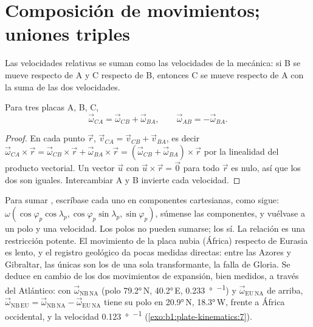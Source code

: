 \section{Composición de movimientos; uniones triples}

Las velocidades relativas se suman como las velocidades de la mecánica: si B se mueve respecto de A y C respecto de B, entonces C se
mueve respecto de A con la suma de las dos velocidades.

\begin{proposition}\label{prop:b1:plate-kinematics:addition}
Para tres placas A, B, C,
\[
  \vec\omega_{CA} = \vec\omega_{CB} + \vec\omega_{BA}, \qquad
  \vec\omega_{AB} = -\vec\omega_{BA}.
\]
\end{proposition}

\begin{proof}
En cada punto $\vec r$, $\vec v_{CA} = \vec v_{CB} + \vec v_{BA}$, es decir
$\vec\omega_{CA}\times\vec r = \vec\omega_{CB}\times\vec r +
\vec\omega_{BA}\times\vec r = (\vec\omega_{CB} + \vec\omega_{BA})\times\vec r$
por la linealidad del producto vectorial. Un vector $\vec u$ con
$\vec u\times\vec r = \vec 0$ para todo $\vec r$ es nulo, así que los dos 
son iguales. Intercambiar A y B invierte cada velocidad.
\end{proof}

Para sumar , escríbase cada uno en componentes cartesianas, como sigue: $\omega(\cos\varphi_p
\cos\lambda_p, \cos\varphi_p\sin\lambda_p, \sin\varphi_p)$, súmense las componentes, y vuélvase a un polo y una velocidad. Los polos no
pueden sumarse; los  sí. La relación es una restricción potente. El movimiento de la placa nubia (África) respecto de
Eurasia es lento, y el registro geológico da pocas medidas directas: entre las Azores y Gibraltar, las únicas son los  de una
sola transformante, la falla de Gloria. Se deduce en cambio de los dos movimientos de expansión, bien medidos, a través del Atlántico:
con $\vec\omega_{\mathrm{NB\,NA}}$ (polo
\ang{79.2}\,N, \ang{40.2}\,E, \qty{0.233}{\degree\per\Myr}) y
$\vec\omega_{\mathrm{EU\,NA}}$ de arriba, $\vec\omega_{\mathrm{NB\,EU}} =
\vec\omega_{\mathrm{NB\,NA}} - \vec\omega_{\mathrm{EU\,NA}}$ tiene su polo en
\ang{20.9}\,N, \ang{18.3}\,W, frente a África occidental, y la velocidad
\qty{0.123}{\degree\per\Myr} (\cref{exo:b1:plate-kinematics:7}).

